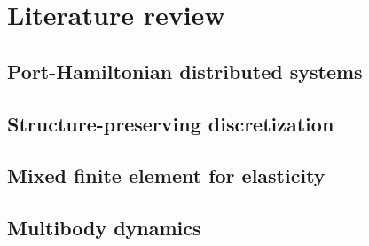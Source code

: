 \chapter[Literature review]{Literature review}

\section{Port-Hamiltonian distributed systems}

\section{Structure-preserving discretization}

\section{Mixed finite element for elasticity}

\section{Multibody dynamics}